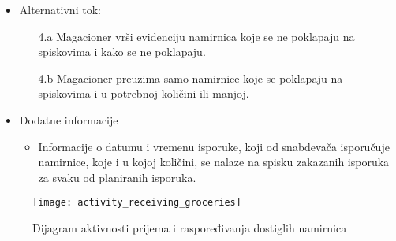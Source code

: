 \begin{itemize}
		\item{Alternativni tok:}
			\begin{enumerate}
				\item[4.a] {Magacioner vrši evidenciju namirnica koje se ne poklapaju na spiskovima i kako se ne poklapaju.} 
				\item[4.b]{Magacioner preuzima samo namirnice koje se poklapaju na spiskovima i u potrebnoj količini ili manjoj.}
			\end{enumerate}
		\item{Dodatne informacije}
			\begin{itemize}
				\item{Informacije o datumu i vremenu isporuke, koji od snabdevača isporučuje namirnice, koje i u kojoj količini, se nalaze na spisku zakazanih isporuka za svaku od planiranih isporuka.}
			\end{itemize}
	\end{itemize}
\begin{figure}[H]
	\begin{center}
		\texttt{[image: activity\_receiving\_groceries]}
		\caption{Dijagram aktivnosti prijema i raspoređivanja dostiglih namirnica}
	\end{center}
\end{figure}
